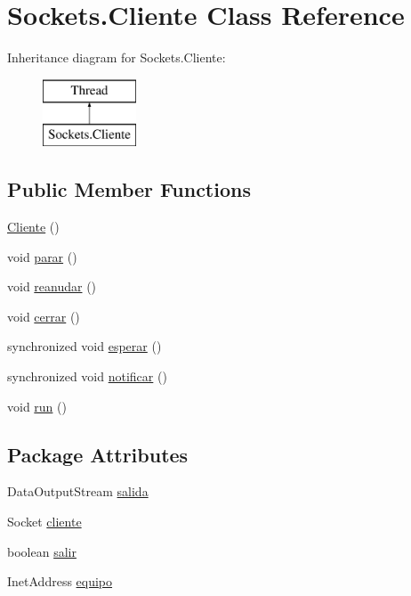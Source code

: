 \hypertarget{class_sockets_1_1_cliente}{}\section{Sockets.\+Cliente Class Reference}
\label{class_sockets_1_1_cliente}
Inheritance diagram for Sockets.\+Cliente\+:\begin{figure}[H]
\begin{center}
\leavevmode
\includegraphics[height=2.000000cm]{class_sockets_1_1_cliente}
\end{center}
\end{figure}
\subsection*{Public Member Functions}
\begin{DoxyCompactItemize}
\item 
\mbox{\hyperlink{class_sockets_1_1_cliente_ab3aed9d5de2bafbb190c27a9c5e7cfd1}{Cliente}} ()
\item 
void \mbox{\hyperlink{class_sockets_1_1_cliente_aef765880b11e7868501bfff2fa4000f6}{parar}} ()
\item 
void \mbox{\hyperlink{class_sockets_1_1_cliente_ae2687fb804fba298cfa152bf078f6795}{reanudar}} ()
\item 
void \mbox{\hyperlink{class_sockets_1_1_cliente_a97cefc10f0737a0e35a923d895b24b30}{cerrar}} ()
\item 
synchronized void \mbox{\hyperlink{class_sockets_1_1_cliente_ad771c3e62e58392ade4f7cddb361bf05}{esperar}} ()
\item 
synchronized void \mbox{\hyperlink{class_sockets_1_1_cliente_a8c72e0702477bfa5ab697ed20fb0a490}{notificar}} ()
\item 
void \mbox{\hyperlink{class_sockets_1_1_cliente_afcd5b6491c7ac4855464028c93d9b0de}{run}} ()
\end{DoxyCompactItemize}
\subsection*{Package Attributes}
\begin{DoxyCompactItemize}
\item 
Data\+Output\+Stream \mbox{\hyperlink{class_sockets_1_1_cliente_a0e85d127bffa834dc946bb2c39a8a7a2}{salida}}
\item 
Socket \mbox{\hyperlink{class_sockets_1_1_cliente_afe26e0d4cbe42f094ce76f958e15fb58}{cliente}}
\item 
boolean \mbox{\hyperlink{class_sockets_1_1_cliente_ab72910fbf98a6c65607aeb382526389a}{salir}}
\item 
Inet\+Address \mbox{\hyperlink{class_sockets_1_1_cliente_a4a8b83baab9f078a2972e51e3f671bf0}{equipo}}
\end{DoxyCompactItemize}


